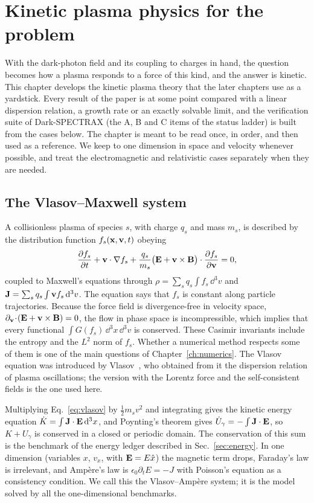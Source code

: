 \chapter{Kinetic plasma physics for the problem}\label{ch:plasma}

With the dark-photon field and its coupling to charges in hand, the question becomes how a plasma responds to a force of this kind, and the answer is kinetic. This chapter develops the kinetic plasma theory that the later chapters use as a yardstick. Every result of the paper is at some point compared with a linear dispersion relation, a growth rate or an exactly solvable limit, and the verification suite of Dark-SPECTRAX (the A, B and C items of the status ladder) is built from the cases below. The chapter is meant to be read once, in order, and then used as a reference. We keep to one dimension in space and velocity whenever possible, and treat the electromagnetic and relativistic cases separately when they are needed.

\section{The Vlasov--Maxwell system}\label{sec:vm}

A collisionless plasma of species $s$, with charge $q_s$ and mass $m_s$, is described by the distribution function $f_s(\mathbf x,\mathbf v,t)$ obeying
\begin{equation}
\frac{\partial f_s}{\partial t}+\mathbf v\cdot\nabla f_s+\frac{q_s}{m_s}\big(\mathbf E+\mathbf v\times\mathbf B\big)\cdot\frac{\partial f_s}{\partial \mathbf v}=0 ,\label{eq:vlasov}
\end{equation}
coupled to Maxwell's equations through $\rho=\sum_sq_s\int f_s\,\dd^3v$ and $\mathbf J=\sum_sq_s\int\mathbf v f_s\,\mathrm{d}^3v$. The equation says that $f_s$ is constant along particle trajectories. Because the force field is divergence-free in velocity space, $\partial_{\mathbf v}\!\cdot\!(\mathbf E+\mathbf v\times\mathbf B)=0$, the flow in phase space is incompressible, which implies that every functional $\int G(f_s)\,\dd^3x\,\dd^3v$ is conserved. These Casimir invariants include the entropy and the $L^2$ norm of $f_s$. Whether a numerical method respects some of them is one of the main questions of Chapter~\ref{ch:numerics}. The Vlasov equation was introduced by Vlasov~\citep{Vlasov1968}, who obtained from it the dispersion relation of plasma oscillations; the version with the Lorentz force and the self-consistent fields is the one used here.

Multiplying Eq.~\eqref{eq:vlasov} by $\tfrac12m_sv^2$ and integrating gives the kinetic energy equation $\dot K=\int\mathbf J\cdot\mathbf E\,\mathrm{d}^3x$, and Poynting's theorem gives $\dot U_\gamma=-\int\mathbf J\cdot\mathbf E$, so $K+U_\gamma$ is conserved in a closed or periodic domain. The conservation of this sum is the benchmark of the energy ledger described in Sec.~\ref{sec:energy}. In one dimension (variables $x$, $v_x$, with $\mathbf E=E\hat x$) the magnetic term drops, Faraday's law is irrelevant, and Amp\`ere's law is $\epsilon_0\partial_tE=-J$ with Poisson's equation as a consistency condition. We call this the Vlasov--Amp\`ere system; it is the model solved by all the one-dimensional benchmarks.

